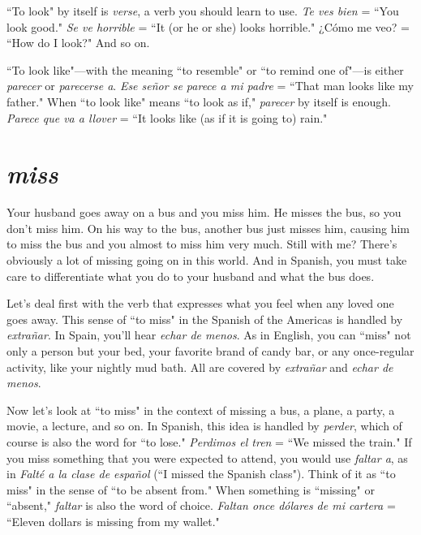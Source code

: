 ``To look" by itself is \emph{verse}, a verb you should learn to use. \emph{Te
	ves bien} = ``You look good." \emph{Se ve horrible} = ``It (or he or she) looks
horrible." ¿Cómo me veo? = ``How do I look?" And so on.

``To look like"---with the meaning ``to resemble" or ``to remind one of"---is either \emph{parecer} or \emph{parecerse a}. \emph{Ese señor se parece a
	mi padre} = ``That man looks like my father." When ``to look like"
means ``to look as if," \emph{parecer} by itself is enough. \emph{Parece que va a
	llover} = ``It looks like (as if it is going to) rain."

\section{\emph{miss}}

Your husband goes away on a bus and you miss him. He
misses the bus, so you don't miss him. On his way to the bus, another
bus just misses him, causing him to miss the bus and you almost to
miss him very much. Still with me? There's obviously a lot of missing
going on in this world. And in Spanish, you must take care to differentiate what you do to your husband and what the bus does.

Let's deal first with the verb that expresses what you feel
when any loved one goes away. This sense of ``to miss" in the Spanish
of the Americas is handled by \emph{extrañar}. In Spain, you'll hear \emph{echar de
	menos}. As in English, you can ``miss" not only a person but your bed,
your favorite brand of candy bar, or any once-regular activity, like your
nightly mud bath. All are covered by \emph{extrañar} and \emph{echar de menos}.

Now let's look at ``to miss" in the context of missing a bus,
a plane, a party, a movie, a lecture, and so on. In Spanish, this idea is
handled by \emph{perder}, which of course is also the word for ``to lose." \emph{Perdimos el tren} = ``We missed the train." If you miss something that
you were expected to attend, you would use \emph{faltar a}, as in \emph{Falté a la
	clase de español} (``I missed the Spanish class"). Think of it as ``to
miss" in the sense of ``to be absent from." When something is ``missing" or ``absent," \emph{faltar} is also the word of choice. \emph{Faltan once dólares
	de mi cartera} = ``Eleven dollars is missing from my wallet."

